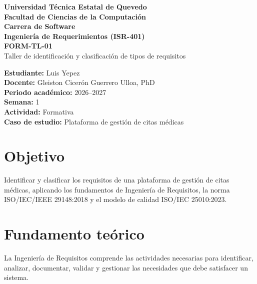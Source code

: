 \documentclass[12pt,a4paper]{article}
\begin{document}

\begin{center}

{\Large\textbf{
Universidad Técnica Estatal de Quevedo
}}\\[0.3cm]

\textbf{Facultad de Ciencias de la Computación}\\

\textbf{Carrera de Software}\\[0.4cm]

\textbf{Ingeniería de Requerimientos (ISR-401)}\\[0.6cm]

{\Large\textbf{FORM-TL-01}}\\[0.2cm]

{\large
Taller de identificación y clasificación
de tipos de requisitos
}

\end{center}

\vspace{0.5cm}

\textbf{Estudiante:} Luis Yepez\\
\textbf{Docente:} Gleiston Cicerón Guerrero Ulloa, PhD\\
\textbf{Periodo académico:} 2026--2027\\
\textbf{Semana:} 1\\
\textbf{Actividad:} Formativa\\
\textbf{Caso de estudio:}
Plataforma de gestión de citas médicas

\section{Objetivo}

Identificar y clasificar los requisitos de una
plataforma de gestión de citas médicas, aplicando
los fundamentos de Ingeniería de Requisitos,
la norma ISO/IEC/IEEE 29148:2018 y el modelo
de calidad ISO/IEC 25010:2023.

\section{Fundamento teórico}

La Ingeniería de Requisitos comprende las
actividades necesarias para identificar,
analizar, documentar, validar y gestionar
las necesidades que debe satisfacer un sistema.
\end{document}
